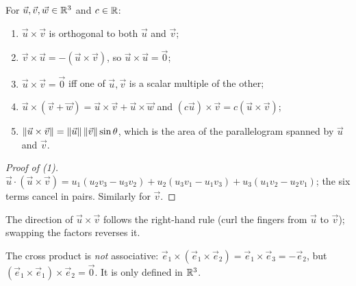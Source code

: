 \begin{theorem}
For $\vec u,\vec v,\vec w\in\mathbb{R}^3$ and $c\in\mathbb{R}$:
\begin{enumerate}
  \item $\vec u\times\vec v$ is orthogonal to both $\vec u$ and $\vec v$;
  \item $\vec v\times\vec u = -(\vec u\times\vec v)$, so $\vec u\times\vec u=\vec 0$;
  \item $\vec u\times\vec v=\vec 0$ iff one of $\vec u,\vec v$ is a scalar multiple of the other;
  \item $\vec u\times(\vec v+\vec w)=\vec u\times\vec v+\vec u\times\vec w$ and
        $(c\vec u)\times\vec v = c(\vec u\times\vec v)$;
  \item $\left\lVert \vec u\times\vec v \right\rVert=\left\lVert \vec u \right\rVert\left\lVert \vec v \right\rVert\sin\theta$, which is the area of the
        parallelogram spanned by $\vec u$ and $\vec v$.
\end{enumerate}
\end{theorem}
\begin{proof}[Proof of (1)]
$\vec u\cdot(\vec u\times\vec v)= u_1(u_2v_3-u_3v_2)+u_2(u_3v_1-u_1v_3)+u_3(u_1v_2-u_2v_1)$;
the six terms cancel in pairs. Similarly for $\vec v$.
\end{proof}

\begin{center}
\end{center}
The direction of $\vec u\times\vec v$ follows the right-hand rule (curl the fingers from $\vec u$
to $\vec v$); swapping the factors reverses it.

\begin{important}[Pitfall]
The cross product is \emph{not} associative: $\vec e_1\times(\vec e_1\times\vec e_2) =
\vec e_1\times\vec e_3 = -\vec e_2$, but $(\vec e_1\times\vec e_1)\times\vec e_2=\vec 0$. It is
only defined in $\mathbb{R}^3$.
\end{important}

